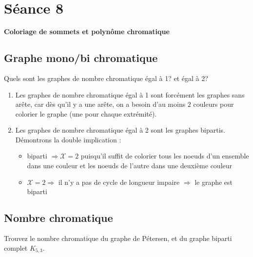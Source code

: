 \section{Séance 8}

\textbf{Coloriage de sommets et polynôme chromatique}

\subsection{Graphe mono/bi chromatique}
Quels sont les graphes de nombre chromatique égal à 1? et égal à 2?

\begin{solution}
  \begin{enumerate}
    \item Les graphes de nombre chromatique égal à 1 sont forcément les graphes sans arête, car dès qu'il y a une arête, on a besoin d'au moins $2$ couleurs pour colorier le graphe (une pour chaque extrémité).
    \item Les graphes de nombre chromatique égal à 2 sont les graphes bipartis. Démontrons la double implication :
    \begin{itemize}
    \item biparti $\Rightarrow \mathcal{X} = 2 $ puisqu'il suffit de colorier tous les noeuds d'un ensemble dans une couleur et les noeuds de l'autre dans une deuxième couleur
    \item $\mathcal{X} = 2 \Rightarrow$ il n'y a pas de cycle de longueur impaire $\Rightarrow$ le graphe est biparti
     \end{itemize}
  \end{enumerate}
\end{solution}

\subsection{Nombre chromatique}
Trouvez le nombre chromatique du graphe de Pétersen, et du graphe biparti complet $K_{5,3}$.

